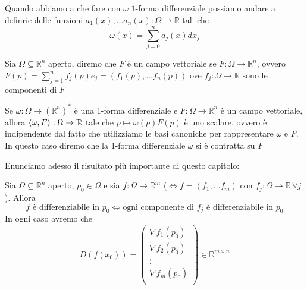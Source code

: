 \begin{remark}
\noindent Quando abbiamo a che fare con $\omega$ $1$-forma differenziale possiamo andare a definrie delle funzioni $a_1(x), \ldots a_n(x): \Omega \to \mathbb{R}$ tali che
$$
\omega(x) = \sum_{j=0}^n a_j(x)dx_j
$$
\end{remark}
\begin{definition}
Sia $\Omega \subseteq \mathbb{R}^n$ aperto, diremo che $F$ è un campo vettoriale se $F: \Omega \to \mathbb{R}^n$, ovvero $F(p) = \sum\limits_{j=1}^n f_j(p)e_j = (f_1(p), \ldots f_n(p))$ ove $f_j: \Omega \to \mathbb{R}$ sono le componenti di $F$
\end{definition}
\begin{remark}
Se $\omega: \Omega \to (\mathbb{R}^n)^{*}$ è una 1-forma differenziale e $F: \Omega \to \mathbb{R}^n$ è un campo vettoriale, allora $\langle \omega, F \rangle: \Omega \to \mathbb{R}$ tale che $p \mapsto \omega(p)F(p)$ è uno scalare, ovvero è indipendente dal fatto che utilizziamo le basi canoniche per rappresentare $\omega$ e $F$. In questo caso diremo che la 1-forma differenziale $\omega$ si è contratta su $F$
\end{remark}
Enunciamo adesso il risultato più importante di questo capitolo:
\begin{theorem}
Sia $\Omega \subseteq \mathbb{R}^n$ aperto, $p_0 \in \Omega$ e sia $f: \Omega \to \mathbb{R}^m$ ($\iff f=(f_1, \ldots f_m)$ con $f_j: \Omega \to \mathbb{R} \, \forall j$). Allora 
$$
f \text{ è differenziabile in } p_0 \iff \text{ogni componente di } f_j \text{ è differenziabile in } p_0
$$
In ogni caso avremo che
$$
D(f(x_0)) = \begin{pmatrix}
\nabla{f_1(p_0)} \\
\nabla{f_2(p_0)} \\
\vdots \\
\nabla{f_m(p_0)} \\
\end{pmatrix} \in \mathbb{R}^{m \times n}
$$
\end{theorem}

